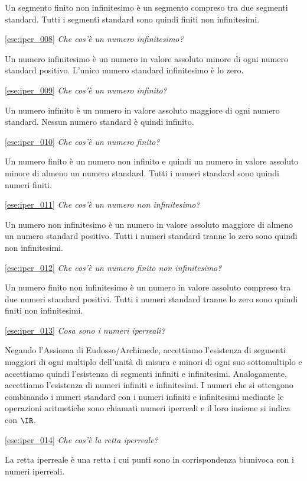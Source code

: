 Un segmento finito non infinitesimo è un segmento compreso tra due segmenti 
standard. Tutti i segmenti standard sono quindi finiti non infinitesimi.

\ref{ese:iper_008} 
\emph{Che cos'è un numero infinitesimo?}

Un numero infinitesimo è un numero in valore assoluto minore di ogni numero 
standard positivo. L'unico numero standard infinitesimo è lo zero.

\ref{ese:iper_009} 
\emph{Che cos'è un numero infinito?}

Un numero infinito è un numero in valore assoluto maggiore di ogni numero 
standard. Nessun numero standard è quindi infinito.

\ref{ese:iper_010} 
\emph{Che cos'è un numero finito?}

Un numero finito è un numero non infinito e quindi un numero in valore 
assoluto 
minore di almeno un numero standard. 
Tutti i numeri standard sono quindi numeri finiti.

\ref{ese:iper_011} 
\emph{Che cos'è un numero non infinitesimo?}

Un numero non infinitesimo è un numero in valore assoluto maggiore di almeno 
un 
numero standard positivo. Tutti i numeri standard tranne lo zero sono quindi 
non infinitesimi.

\ref{ese:iper_012} 
\emph{Che cos'è un numero finito non infinitesimo?}

Un numero finito non infinitesimo è un numero in valore assoluto compreso tra 
due numeri standard positivi. Tutti i numeri standard tranne lo zero sono 
quindi finiti non infinitesimi.

\ref{ese:iper_013} 
\emph{Cosa sono i numeri iperreali?}

Negando l'Assioma di Eudosso/Archimede, accettiamo l'esistenza di segmenti 
maggiori di ogni multiplo dell'unità di misura e minori di ogni suo 
sottomultiplo e accettiamo quindi l'esistenza di segmenti infiniti e 
infinitesimi. Analogamente, accettiamo l'esistenza di numeri infiniti e 
infinitesimi. I numeri che si ottengono combinando i numeri standard con i 
numeri infiniti e infinitesimi mediante le operazioni aritmetiche sono 
chiamati 
numeri iperreali e il loro insieme si indica con \(\IR\).

\ref{ese:iper_014} 
\emph{Che cos'è la retta iperreale?}

La retta iperreale è una retta i cui punti sono in corrispondenza biunivoca 
con 
i numeri iperreali.

